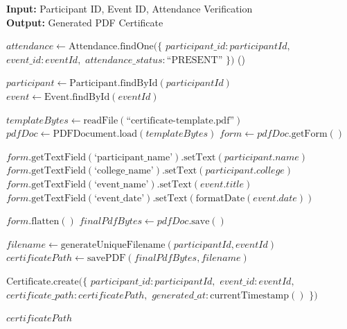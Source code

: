 \begin{algorithm}[H]
\caption{Certificate Generation Process}
\label{alg:certificate_generation}
\textbf{Input:} Participant ID, Event ID, Attendance Verification\\
\textbf{Output:} Generated PDF Certificate
\begin{algorithmic}[1]
    \State $attendance \gets \text{Attendance.findOne}(\{$
    \State \hspace{1em} $participant\_id: participantId,$
    \State \hspace{1em} $event\_id: eventId,$
    \State \hspace{1em} $attendance\_status: \text{``PRESENT''}$
    \State $\})$
        \State \Return {}()
    \EndIf
    
    \State $participant \gets \text{Participant.findById}(participantId)$
    \State $event \gets \text{Event.findById}(eventId)$
    
    \State $templateBytes \gets \text{readFile}(\text{``certificate-template.pdf''})$
    \State $pdfDoc \gets \text{PDFDocument.load}(templateBytes)$
    \State $form \gets pdfDoc.\text{getForm}()$
    
    \State $form.\text{getTextField}(\text{`participant\_name'}).\text{setText}(participant.name)$
    \State $form.\text{getTextField}(\text{`college\_name'}).\text{setText}(participant.college)$
    \State $form.\text{getTextField}(\text{`event\_name'}).\text{setText}(event.title)$
    \State $form.\text{getTextField}(\text{`event\_date'}).\text{setText}(\text{formatDate}(event.date))$
    
    \State $form.\text{flatten}()$
    \State $finalPdfBytes \gets pdfDoc.\text{save}()$
    
    \State $filename \gets \text{generateUniqueFilename}(participantId, eventId)$
    \State $certificatePath \gets \text{savePDF}(finalPdfBytes, filename)$
    
    \State $\text{Certificate.create}(\{$
    \State \hspace{1em} $participant\_id: participantId,$
    \State \hspace{1em} $event\_id: eventId,$
    \State \hspace{1em} $certificate\_path: certificatePath,$
    \State \hspace{1em} $generated\_at: \text{currentTimestamp}()$
    \State $\})$
    
    \State \Return $certificatePath$
\EndFunction
\end{algorithmic}
\end{algorithm}

